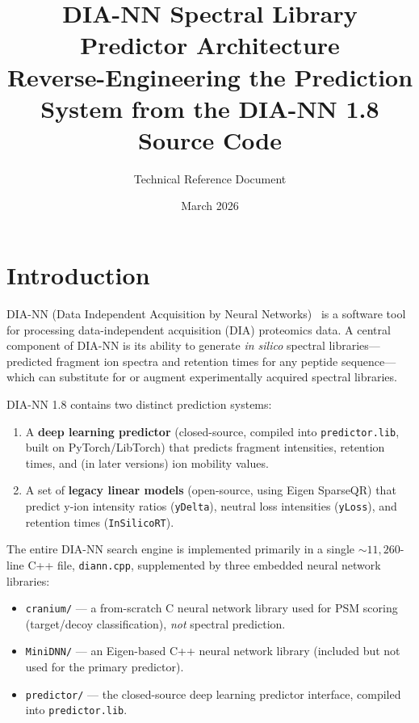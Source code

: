 \documentclass[11pt,a4paper]{article}
\title{DIA-NN Spectral Library Predictor Architecture\\[0.5em]
\large Reverse-Engineering the Prediction System from the DIA-NN 1.8 Source Code}
\author{Technical Reference Document}
\date{March 2026}
\begin{document}
\maketitle

\tableofcontents
\newpage

\section{Introduction}

DIA-NN (Data Independent Acquisition by Neural Networks)~\cite{demichev2020} is a software tool for processing data-independent acquisition (DIA) proteomics data. A central component of DIA-NN is its ability to generate \emph{in silico} spectral libraries---predicted fragment ion spectra and retention times for any peptide sequence---which can substitute for or augment experimentally acquired spectral libraries.

DIA-NN 1.8 contains two distinct prediction systems:
\begin{enumerate}
    \item A \textbf{deep learning predictor} (closed-source, compiled into \texttt{predictor.lib}, built on PyTorch/LibTorch) that predicts fragment intensities, retention times, and (in later versions) ion mobility values.
    \item A set of \textbf{legacy linear models} (open-source, using Eigen SparseQR) that predict y-ion intensity ratios (\texttt{yDelta}), neutral loss intensities (\texttt{yLoss}), and retention times (\texttt{InSilicoRT}).
\end{enumerate}

The entire DIA-NN search engine is implemented primarily in a single ${\sim}11{,}260$-line C++ file, \texttt{diann.cpp}, supplemented by three embedded neural network libraries:
\begin{itemize}
    \item \texttt{cranium/} --- a from-scratch C neural network library used for PSM scoring (target/decoy classification), \emph{not} spectral prediction.
    \item \texttt{MiniDNN/} --- an Eigen-based C++ neural network library (included but not used for the primary predictor).
    \item \texttt{predictor/} --- the closed-source deep learning predictor interface, compiled into \texttt{predictor.lib}.
\end{itemize}
\end{document}
